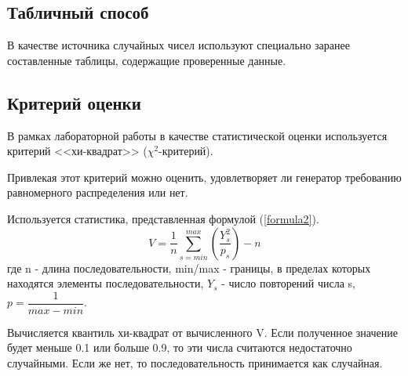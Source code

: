 \subsection{Табличный способ}
В качестве источника случайных чисел используют специально заранее составленные таблицы, содержащие проверенные данные.

\subsection{Критерий оценки}
В рамках лабораторной работы в качестве статистической оценки используется критерий <<хи-квадрат>> ($\chi^2$-критерий).

Привлекая этот критерий можно оценить, удовлетворяет ли генератор требованию равномерного распределения или нет.

Используется статистика, представленная формулой (\ref{formula2}).
\begin{equation}\label{formula2}
	V = \frac{1}{n}\sum_{s=min}^{max} \left( \frac{Y_s^2}{p_s} \right) - n
\end{equation}
где n - длина последовательности, min/max - границы, в пределах которых находятся элементы последовательности, $Y_s$ - число повторений числа s, $p = \dfrac{1}{max - min}$.

Вычисляется квантиль хи-квадрат от вычисленного V. Если полученное значение будет меньше 0.1 или больше 0.9, то эти числа считаются недостаточно случайными. Если же нет, то последовательность принимается как случайная. 

 
